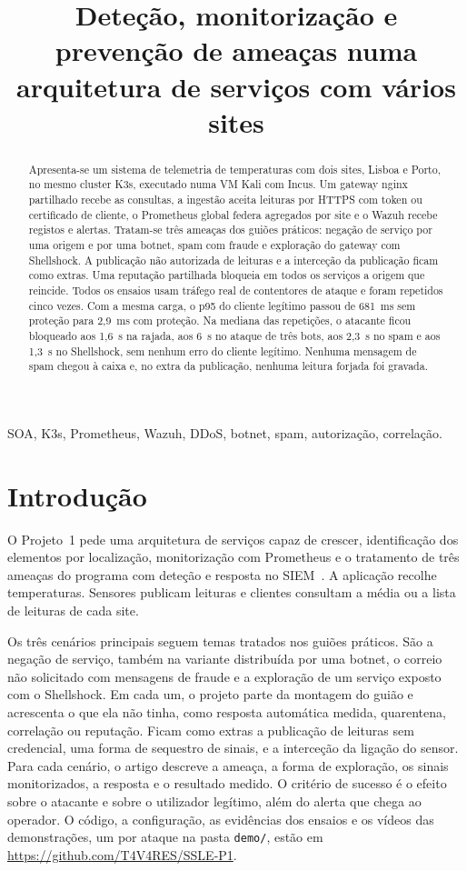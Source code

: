 \documentclass[conference,a4paper]{IEEEtran}
\title{Deteção, monitorização e prevenção de ameaças numa arquitetura de serviços com vários sites}
\author{\IEEEauthorblockN{Guilherme Tavares (119867)}
\IEEEauthorblockA{Mestrado em Cibersegurança --- Segurança em Sistemas de Larga Escala\\
Universidade de Aveiro\\Projeto 1, novembro de 2026}}
\newcommand{\code}[1]{\texttt{\small #1}}
\begin{document}
\maketitle

\begin{abstract}
Apresenta-se um sistema de telemetria de temperaturas com dois sites, Lisboa e Porto, no mesmo cluster K3s, executado numa VM Kali com Incus. Um gateway nginx partilhado recebe as consultas, a ingestão aceita leituras por HTTPS com token ou certificado de cliente, o Prometheus global federa agregados por site e o Wazuh recebe registos e alertas. Tratam-se três ameaças dos guiões práticos: negação de serviço por uma origem e por uma botnet, spam com fraude e exploração do gateway com Shellshock. A publicação não autorizada de leituras e a interceção da publicação ficam como extras. Uma reputação partilhada bloqueia em todos os serviços a origem que reincide. Todos os ensaios usam tráfego real de contentores de ataque e foram repetidos cinco vezes. Com a mesma carga, o p95 do cliente legítimo passou de 681~ms sem proteção para 2,9~ms com proteção. Na mediana das repetições, o atacante ficou bloqueado aos 1,6~s na rajada, aos 6~s no ataque de três bots, aos 2,3~s no spam e aos 1,3~s no Shellshock, sem nenhum erro do cliente legítimo. Nenhuma mensagem de spam chegou à caixa e, no extra da publicação, nenhuma leitura forjada foi gravada.
\end{abstract}

\begin{IEEEkeywords}
SOA, K3s, Prometheus, Wazuh, DDoS, botnet, spam, autorização, correlação.
\end{IEEEkeywords}

\section{Introdução}
O Projeto~1 pede uma arquitetura de serviços capaz de crescer, identificação dos elementos por localização, monitorização com Prometheus e o tratamento de três ameaças do programa com deteção e resposta no SIEM~\cite{course}. A aplicação recolhe temperaturas. Sensores publicam leituras e clientes consultam a média ou a lista de leituras de cada site.

Os três cenários principais seguem temas tratados nos guiões práticos. São a negação de serviço, também na variante distribuída por uma botnet, o correio não solicitado com mensagens de fraude e a exploração de um serviço exposto com o Shellshock. Em cada um, o projeto parte da montagem do guião e acrescenta o que ela não tinha, como resposta automática medida, quarentena, correlação ou reputação. Ficam como extras a publicação de leituras sem credencial, uma forma de sequestro de sinais, e a interceção da ligação do sensor. Para cada cenário, o artigo descreve a ameaça, a forma de exploração, os sinais monitorizados, a resposta e o resultado medido. O critério de sucesso é o efeito sobre o atacante e sobre o utilizador legítimo, além do alerta que chega ao operador. O código, a configuração, as evidências dos ensaios e os vídeos das demonstrações, um por ataque na pasta \code{demo/}, estão em \url{https://github.com/T4V4RES/SSLE-P1}.
\end{document}
